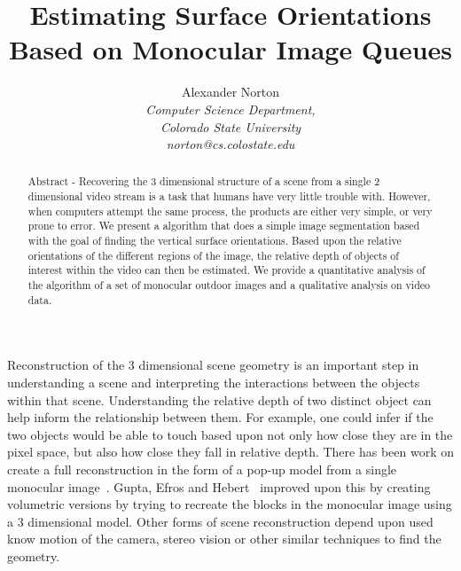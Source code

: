 \documentclass[times,10pt,twocolumn]{article}
\begin{document}
\title{Estimating Surface Orientations Based on Monocular Image Queues}

\author{Alexander Norton\\
\emph{Computer Science Department,}\\
\emph{Colorado State University}\\
\emph{norton@cs.colostate.edu}\\
}

\maketitle
\thispagestyle{empty}

\begin{abstract}
Abstract - Recovering the 3 dimensional structure of a scene from a single 2
dimensional video stream is a task that humans have very little trouble with.
However, when computers attempt the same process, the products are either very
simple, or very prone to error. We present a algorithm that does a simple image
segmentation based with the goal of finding the vertical surface orientations.
Based upon the relative orientations of the different regions of the image, the
relative depth of objects of interest within the video can then be estimated.
We provide a quantitative analysis of the algorithm of a set of monocular
outdoor images and a qualitative analysis on video data.
\end{abstract}


Reconstruction of the 3 dimensional scene geometry is an important step in
understanding a scene and interpreting the interactions between the objects
within that scene. Understanding the relative depth of two distinct object can
help inform the relationship between them. For example, one could infer if the
two objects would be able to touch based upon not only how close they are in
the pixel space, but also how close they fall in relative depth. There has been
work on create a full reconstruction in the form of a pop-up model from a
single monocular image~\cite{Hoiem-05, Hoiem-08, Sexana}. Gupta, Efros and
Hebert~\cite{Gupta} improved upon this by creating volumetric versions by
trying to recreate the blocks in the monocular image using a 3 dimensional
model. Other forms of scene reconstruction depend upon used know motion of the
camera, stereo vision or other similar techniques to find the geometry.
\end{document}
